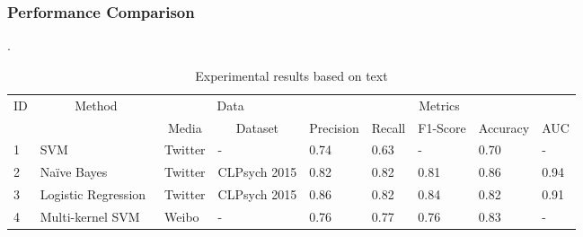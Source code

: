 \subsubsection{Performance Comparison}
.
\begin{table*}
\centering
\caption{Experimental results based on text}
\label{tab5}
\begin{tabular}{l|l|ll|lllll}

\hline
\multicolumn{1}{c|}{\multirow{2}{*}{ID}} & \multicolumn{1}{c|}{\multirow{2}{*}{Method}}                                          & \multicolumn{2}{c|}{Data}                                     & \multicolumn{5}{c}{Metrics}                                                                                                                        \\
\multicolumn{1}{c|}{}                    & \multicolumn{1}{c|}{}                                                                 & \multicolumn{1}{c}{Media}      & \multicolumn{1}{c|}{Dataset} & \multicolumn{1}{c}{Precision} & \multicolumn{1}{c}{Recall} & \multicolumn{1}{c}{F1-Score} & \multicolumn{1}{c}{Accuracy} & \multicolumn{1}{c}{AUC} \\
\hline
1                                       & SVM~\cite{de2013predicting}                                    & Twitter                        & -                           & 0.74                          & 0.63                       & -                            & 0.70                         & -                       \\
2                                       & Naïve Bayes~\cite{nadeem2016identifying}                       & Twitter                        & CLPsych 2015                & 0.82                          & 0.82                       & 0.81                         & 0.86                         & 0.94                    \\
3                                       & Logistic Regression~\cite{nadeem2016identifying}               & Twitter                        & CLPsych 2015                & 0.86                          & 0.82                       & 0.84                         & 0.82                         & 0.91                    \\
4                                       & Multi-kernel SVM~\cite{peng2019multi}                          & Weibo                          & -                           & 0.76                          & 0.77                       & 0.76                         & 0.83                         & -                       \\

\end{tabular}
\end{table*}
